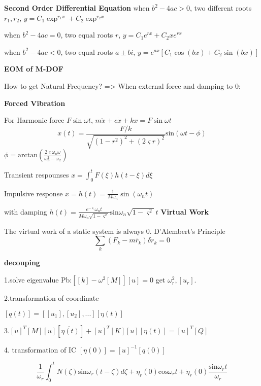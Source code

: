 \documentclass{article}
\begin{document}
\begin{multicols*}{3}
\noindent\textbf{Second Order Differential Equation}
 when $b^2 - 4ac > 0$, two different roots $r_1, r_2$, $y = C_1\exp^{r_1 x} + C_2\exp^{r_2 x}$

  when $b^2 - 4ac = 0$, two equal roots $r$, $y = C_1 e^{r x} + C_2 x e^{r x}$
  
 when $b^2 - 4ac < 0$, two equal roots $a \pm bi$, $y = e^{ax} [C_1 \cos(b x) + C_2 \sin(b x)]$


  \noindent\textbf{EOM of M-DOF}

 How to get Natural Frequency? => When external force and damping to 0:


  \noindent\textbf{Forced Vibration}

 For Harmonic force $F\sin\omega t$, $m\ddot{x} + c\dot{x} + kx = F\sin\omega t$
\begin{equation*}
  x(t)=\frac{F/k}{\sqrt{(1-r^{2})^{2}+(2\varsigma r)^{2}}}\text{sin}(\omega t-\phi)
\end{equation*}
$\phi=\text{arctan}(\frac{2 \varsigma \omega_{n}\omega}{\omega_{n}^{2}-\omega_{2}})$
  
Transient respounses  $x = \int_0^t F(\xi) h(t-\xi) d\xi$

Impulsive response $x=h(t) = \frac{1}{M\omega_n}\sin(\omega_n t)$

with damping $h(t)=\frac{e^{-\varsigma}\omega_{n}t}{M\omega_{n}\sqrt{1-\varsigma^{2}}}\text{sin}\omega_{n}\sqrt{1-\varsigma^{2}}t$
  \noindent\textbf{Virtual Work}

 The virtual work of a static system is always 0.
  D'Alembert's Principle
    \begin{equation*}
      \sum_k (F_k - m \ddot{r_k}) \delta r_k = 0
    \end{equation*}

\noindent\textbf{decouping}

1.solve eigenvalue Pb:$[[k]-\omega^{2}[M]][u]=0$
get $\omega_{r}^{2},[u_{r}]$.

2.transformation of coordinate

$[q(t)]=[[u_{1}],[u_{2}],...][\eta(t)]$

3.$[u]^{T}[M][u][\ddot{\eta(t)}]+[u]^{T}[K][u][\eta(t)]=[u]^{T}[Q]$

4. transformation of IC $[\eta(0)]=[u]^{-1}[q(0)]$

\begin{equation*}
  \frac{1}{\omega_{r}}\int_{0}^{t}N(\zeta)\text{sin}\omega_{r}(t-\zeta)d\zeta+\eta_{r}(0)\text{cos}\omega_{r}t+\dot{\eta}_{r}(0)\frac{\text{sin}\omega_{r}t}{\omega_{r}}
\end{equation*}


\end{multicols*}
\end{document}
